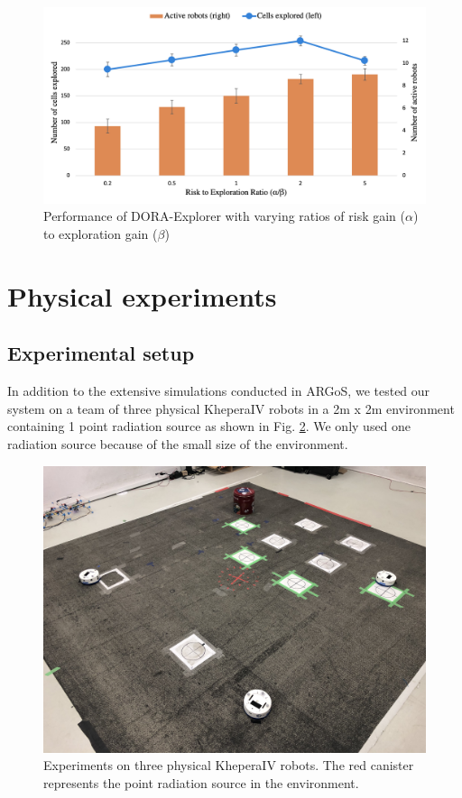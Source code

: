 \documentclass[letterpaper, 10 pt, conference]{ieeeconf}
\begin{document}
\begin{figure}[h]
    \centering
    \includegraphics[width=0.95\columnwidth]{images/parameters.png}
    \caption{Performance of DORA-Explorer with varying ratios of risk gain ($\alpha$) to exploration gain ($\beta$)}
    \label{results:parameters}
\end{figure}




\section{Physical experiments}
\subsection{Experimental setup}
In addition to the extensive simulations conducted in ARGoS, we tested
our system on a team of three physical KheperaIV robots in a 2m x 2m
environment containing 1 point radiation source as shown in
Fig. \ref{arena}. We only used one radiation source because of the small size of the environment.

\begin{figure}[h]
    \centering
    \captionsetup{belowskip=0pt}
    \includegraphics[width=0.65\columnwidth]{images/arena.jpeg}
    \caption{Experiments on three physical KheperaIV robots. The red canister represents the point radiation source in the environment.}
    \label{arena}
\end{figure}
\end{document}
